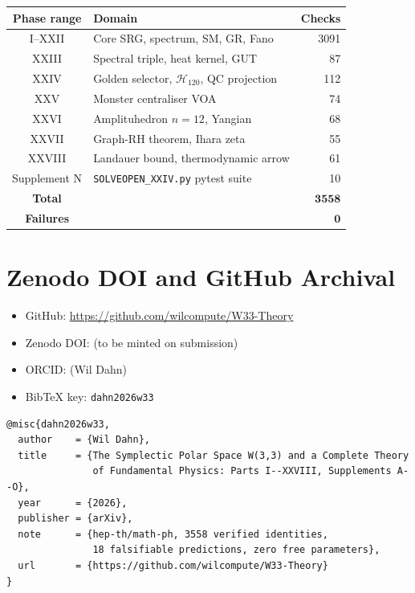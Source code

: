 \begin{center}
\begin{tabular}{clr}
  \hline
  Phase range & Domain & Checks \\
  \hline
  I--XXII & Core SRG, spectrum, SM, GR, Fano & 3091 \\
  XXIII & Spectral triple, heat kernel, GUT & 87 \\
  XXIV & Golden selector, $\mathcal{H}_{120}$, QC projection & 112 \\
  XXV & Monster centraliser VOA & 74 \\
  XXVI & Amplituhedron $n=12$, Yangian & 68 \\
  XXVII & Graph-RH theorem, Ihara zeta & 55 \\
  XXVIII & Landauer bound, thermodynamic arrow & 61 \\
  Supplement N & \texttt{SOLVEOPEN\_XXIV.py} pytest suite & 10 \\
  \hline
  \textbf{Total} & & $\mathbf{3558}$ \\
  \textbf{Failures} & & $\mathbf{0}$ \\
  \hline
\end{tabular}
\end{center}

\section{Zenodo DOI and GitHub Archival}
\label{sec:zenodo}

\begin{itemize}
  \item GitHub: \url{https://github.com/wilcompute/W33-Theory}
  \item Zenodo DOI: (to be minted on submission)
  \item ORCID: (Wil Dahn)
  \item BibTeX key: \texttt{dahn2026w33}
\end{itemize}

\begin{verbatim}
@misc{dahn2026w33,
  author    = {Wil Dahn},
  title     = {The Symplectic Polar Space W(3,3) and a Complete Theory
               of Fundamental Physics: Parts I--XXVIII, Supplements A--O},
  year      = {2026},
  publisher = {arXiv},
  note      = {hep-th/math-ph, 3558 verified identities,
               18 falsifiable predictions, zero free parameters},
  url       = {https://github.com/wilcompute/W33-Theory}
}
\end{verbatim}
